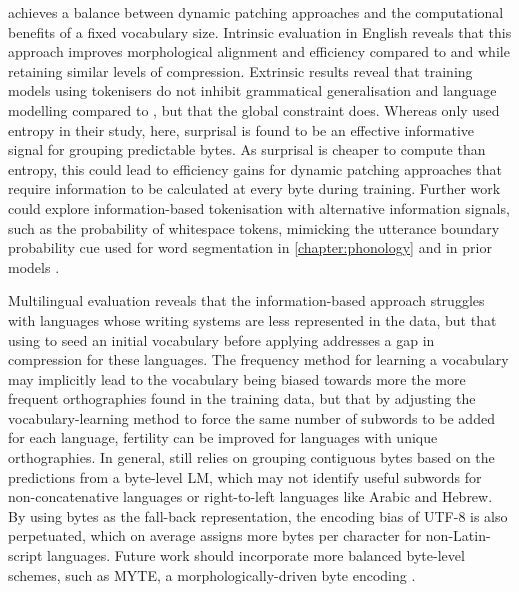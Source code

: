 \tokname achieves a balance between dynamic patching approaches and the computational benefits of a fixed vocabulary size. Intrinsic evaluation in English reveals that this approach improves morphological alignment and \renyi efficiency compared to \bpe and \bpewp while retaining similar levels of compression. Extrinsic results reveal that training models using \tokname tokenisers do not inhibit grammatical generalisation and language modelling compared to \bpe, but that the global constraint does. Whereas \citet{pagnoni2024byte} only used entropy in their study, here, surprisal is found to be an effective informative signal for grouping predictable bytes. As surprisal is cheaper to compute than entropy, this could lead to efficiency gains for dynamic patching approaches that require information to be calculated at every byte during training. Further work could explore information-based tokenisation with alternative information signals, such as the probability of whitespace tokens, mimicking the utterance boundary probability cue used for word segmentation in \cref{chapter:phonology} and in prior models \citep{christiansen1998learning}.

Multilingual evaluation reveals that the information-based approach struggles with languages whose writing systems are less represented in the data, but that using \tokname to seed an initial vocabulary before applying \bpe addresses a gap in compression for these languages. The frequency method for learning a vocabulary may implicitly lead to the vocabulary being biased towards more the more frequent orthographies found in the training data, but that by adjusting the vocabulary-learning method to force the same number of subwords to be added for each language, fertility can be improved for languages with unique orthographies. In general, \tokname still relies on grouping contiguous bytes based on the predictions from a byte-level LM, which may not identify useful subwords for non-concatenative languages or right-to-left languages like Arabic and Hebrew. By using bytes as the fall-back representation, the encoding bias of UTF-8 is also perpetuated, which on average assigns more bytes per character for non-Latin-script languages. Future work should incorporate more balanced byte-level schemes, such as MYTE, a morphologically-driven byte encoding \citep{limisiewicz-etal-2024-myte}.

